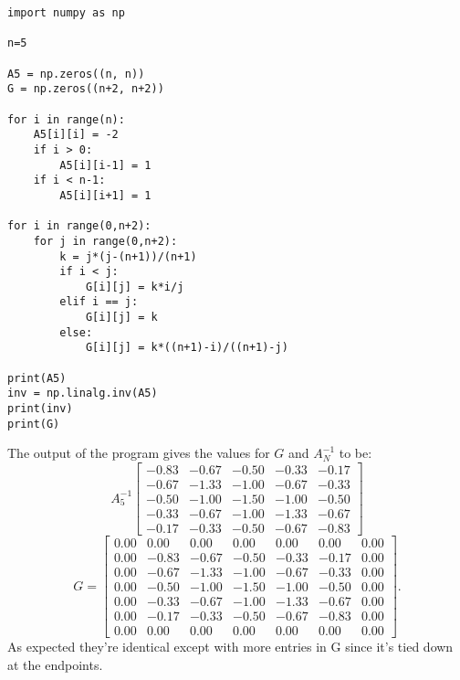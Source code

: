\documentclass[letterpaper, reqno,11pt]{article}
\begin{document}
\begin{lstlisting}
import numpy as np

n=5

A5 = np.zeros((n, n))
G = np.zeros((n+2, n+2))

for i in range(n):
    A5[i][i] = -2
    if i > 0:
        A5[i][i-1] = 1
    if i < n-1:
        A5[i][i+1] = 1

for i in range(0,n+2):
    for j in range(0,n+2):
        k = j*(j-(n+1))/(n+1)
        if i < j:
            G[i][j] = k*i/j
        elif i == j:
            G[i][j] = k
        else:
            G[i][j] = k*((n+1)-i)/((n+1)-j)

print(A5)
inv = np.linalg.inv(A5)
print(inv)
print(G)
\end{lstlisting}

The output of the program gives the values for $G$ and $A_N^{-1}$ to be:
\[
A_5^{-1}\begin{bmatrix}
-0.83 & -0.67 & -0.50 & -0.33 & -0.17 \\
-0.67 & -1.33 & -1.00 & -0.67 & -0.33 \\
-0.50 & -1.00 & -1.50 & -1.00 & -0.50 \\
-0.33 & -0.67 & -1.00 & -1.33 & -0.67 \\
-0.17 & -0.33 & -0.50 & -0.67 & -0.83
\end{bmatrix}
\]
\[
G=\begin{bmatrix}
0.00 & 0.00 & 0.00 & 0.00 & 0.00 & 0.00 & 0.00 \\
0.00 & -0.83 & -0.67 & -0.50 & -0.33 & -0.17 & 0.00 \\
0.00 & -0.67 & -1.33 & -1.00 & -0.67 & -0.33 & 0.00 \\
0.00 & -0.50 & -1.00 & -1.50 & -1.00 & -0.50 & 0.00 \\
0.00 & -0.33 & -0.67 & -1.00 & -1.33 & -0.67 & 0.00 \\
0.00 & -0.17 & -0.33 & -0.50 & -0.67 & -0.83 & 0.00 \\
0.00 & 0.00 & 0.00 & 0.00 & 0.00 & 0.00 & 0.00
\end{bmatrix}
.\]
As expected they're identical except with more entries in G since it's tied down at the endpoints.

\end{document}
